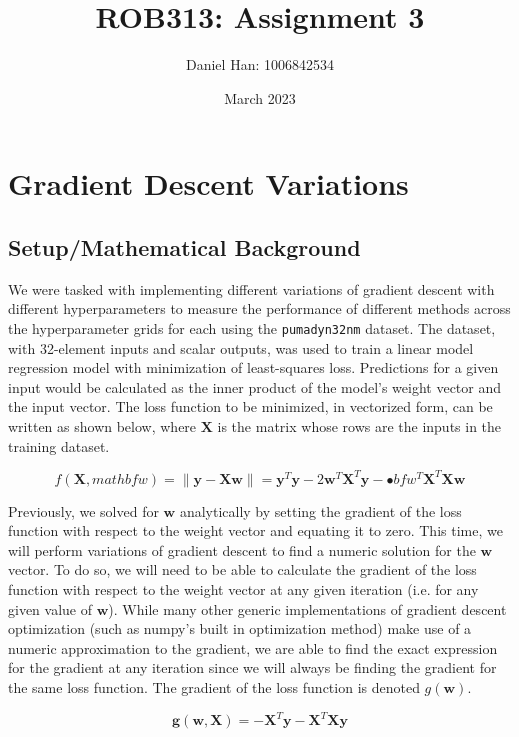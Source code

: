 \documentclass{article}
\title{ROB313: Assignment 3}
\author{Daniel Han: 1006842534}
\date{March 2023}
\begin{document}
\maketitle

\section{Gradient Descent Variations}

\subsection{Setup/Mathematical Background}
We were tasked with implementing different variations of gradient descent with different hyperparameters to measure the performance of different methods across the hyperparameter grids for each using the \verb+pumadyn32nm+ dataset. The dataset, with 32-element inputs and scalar outputs, was used to train a linear model regression model with minimization of least-squares loss. Predictions for a given input would be calculated as the inner product of the model's weight vector and the input vector. The loss function to be minimized, in vectorized form, can be written as shown below, where $\mathbf{X}$ is the matrix whose rows are the inputs in the training dataset.

\begin{equation}
f(\mathbf{X}, mathbf{w}) = \| \mathbf{y} - \mathbf{X}\mathbf{w} \| = \mathbf{y}^{T} \mathbf{y} - 2\mathbf{w}^{T} \mathbf{X}^{T} \mathbf{y} - \mathbf{•}bf{w}^{T} \mathbf{X}^{T} \mathbf{X}\mathbf{w}
\end{equation}

Previously, we solved for $\mathbf{w}$ analytically by setting the gradient of the loss function with respect to the weight vector and equating it to zero. This time, we will perform variations of gradient descent to find a numeric solution for the $\mathbf{w}$ vector. To do so, we will need to be able to calculate the gradient of the loss function with respect to the weight vector at any given iteration (i.e. for any given value of $\mathbf{w}$). While many other generic implementations of gradient descent optimization (such as numpy's built in optimization method) make use of a numeric approximation to the gradient, we are able to find the exact expression for the gradient at any iteration since we will always be finding the gradient for the same loss function. The gradient of the loss function is denoted $g(\mathbf{w})$.

\begin{equation}
\mathbf{g}(\mathbf{w}, \mathbf{X}) = -\mathbf{X}^T\mathbf{y} - \mathbf{X}^{T}\mathbf{X}\mathbf{y}
\end{equation}
\end{document}
